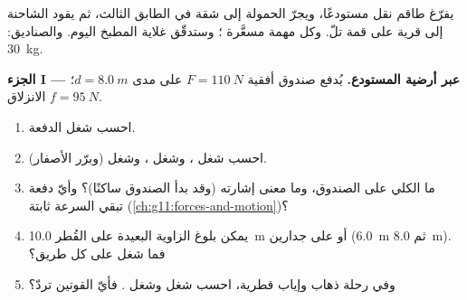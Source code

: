 \begin{problem}
\label{pb:g11:work-of-force:1}
يفرّغ طاقم نقل مستودعًا، ويجرّ الحمولة إلى شقة في الطابق
الثالث، ثم يقود الشاحنة إلى قرية على قمة تلّ. وكل مهمة مسعَّرة
؛ وستدقّق غلاية المطبخ اليوم. والصناديق: \qty{30}{kg}.

\medskip
\noindent\textbf{الجزء I --- عبر أرضية المستودع.}
يُدفع صندوق  أفقية $F = \qty{110}{N}$ على مدى
$d = \qty{8.0}{m}$؛  الانزلاق $f = \qty{95}{N}$.
\begin{enumerate}
  \item احسب شغل الدفعة.
  \item احسب شغل ، وشغل ، وشغل  (وبرّر الأصفار).
  \item ما  الكلي على الصندوق، وما معنى إشارته (وقد بدأ
        الصندوق ساكنًا)؟ وأيّ دفعة تبقي السرعة ثابتة
        (\cref{ch:g11:forces-and-motion})؟
  \item يمكن بلوغ الزاوية البعيدة على القُطر \qty{10.0}{m}
        أو على جدارين (\qty{6.0}{m} ثم \qty{8.0}{m}). فما شغل 
        على كل طريق؟
  \item وفي رحلة ذهاب وإياب قطرية، احسب شغل
         وشغل . فأيّ القوتين تردّ؟
\end{enumerate}


\end{problem}

